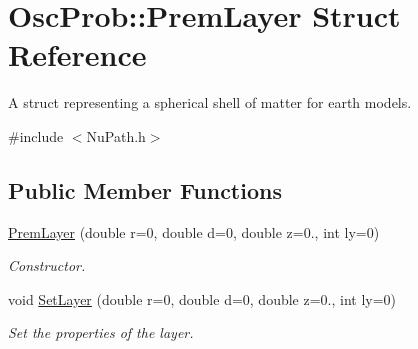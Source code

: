 \hypertarget{structOscProb_1_1PremLayer}{}\section{Osc\+Prob\+:\+:Prem\+Layer Struct Reference}
\label{structOscProb_1_1PremLayer}


A struct representing a spherical shell of matter for earth models.  




{\ttfamily \#include $<$Nu\+Path.\+h$>$}

\subsection*{Public Member Functions}
\begin{DoxyCompactItemize}
\item 
\hyperlink{structOscProb_1_1PremLayer_abb89fe4d38627dcd49a7861e699af14f}{Prem\+Layer} (double r=0, double d=0, double z=0., int ly=0)
\begin{DoxyCompactList}\small\item\em Constructor. \end{DoxyCompactList}\item 
void \hyperlink{structOscProb_1_1PremLayer_a9d35d6d32ff3dab5cb1aa0c769c65c2b}{Set\+Layer} (double r=0, double d=0, double z=0., int ly=0)
\begin{DoxyCompactList}\small\item\em Set the properties of the layer. \end{DoxyCompactList}\end{DoxyCompactItemize}
